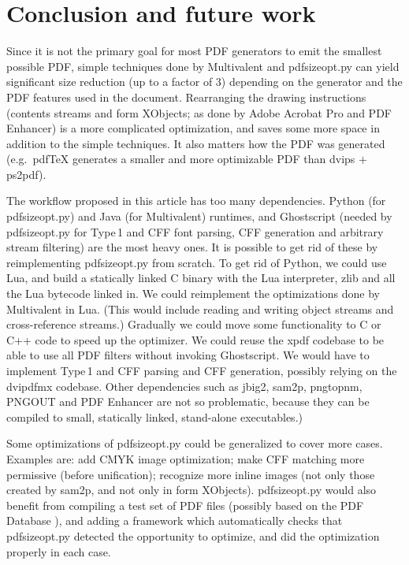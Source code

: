 \documentclass{ltugproc}
\def\cmd{\textsf}
\def\pkg{\textsf}
\begin{document}
\section{Conclusion and future work}\label{future-work}

Since it is not the primary goal for most PDF generators to emit the
smallest possible PDF, simple techniques done by Multivalent and
\cmd{pdfsizeopt.py} can yield significant size reduction (up to a
factor of 3) depending on the generator and the PDF features used in the
document. Rearranging the drawing instructions (contents streams and form
XObjects; as done by Adobe Acrobat Pro and PDF Enhancer) is a more
complicated optimization, and saves some more space in addition to the
simple techniques. It also matters how the PDF was generated (e.g.\
pdf\TeX{} generates a smaller and more optimizable PDF than \cmd{dvips} $+$
\cmd{ps2pdf}).

The workflow proposed in this article has too many dependencies. Python
(for \cmd{pdfsizeopt.py}) and Java (for Multivalent) runtimes, and
Ghostscript (needed by \cmd{pdfsizeopt.py} for Type\,1 and CFF font parsing,
CFF generation and arbitrary stream filtering) are the most heavy ones. It
is possible to get rid of these by reimplementing \cmd{pdfsizeopt.py} from
scratch. To get rid of Python, we could use Lua, and build a statically
linked C binary with the Lua interpreter, \pkg{zlib} and all the Lua bytecode
linked in. We could reimplement the optimizations done by
Multivalent in Lua. (This would include reading and writing object streams
and cross-reference streams.)
Gradually we could move some functionality to C or C++
code to speed up the optimizer. We could reuse the \cmd{xpdf} codebase to
be able to use all PDF filters without invoking Ghostscript. We would have
to implement Type\,1 and CFF parsing and CFF generation, possibly relying on
the \cmd{dvipdfmx} codebase.
Other dependencies such as \cmd{jbig2}, \cmd{sam2p}, \cmd{pngtopnm},
PNGOUT and PDF Enhancer are not so problematic, because they can be compiled
to small, statically linked, stand-alone executables.)

Some optimizations of \cmd{pdfsizeopt.py} could be generalized to cover more
cases. Examples are: add CMYK image optimization; make CFF matching more
permissive (before unification); recognize more inline images (not only
those created by \cmd{sam2p}, and not only in form XObjects).
\cmd{pdfsizeopt.py} would also benefit from compiling a test set of PDF
files (possibly based on the PDF Database \cite{pdfdb}), and
adding a framework which automatically checks that \cmd{pdfsizeopt.py}
detected the opportunity to optimize, and did the optimization properly in
each case.
\end{document}
